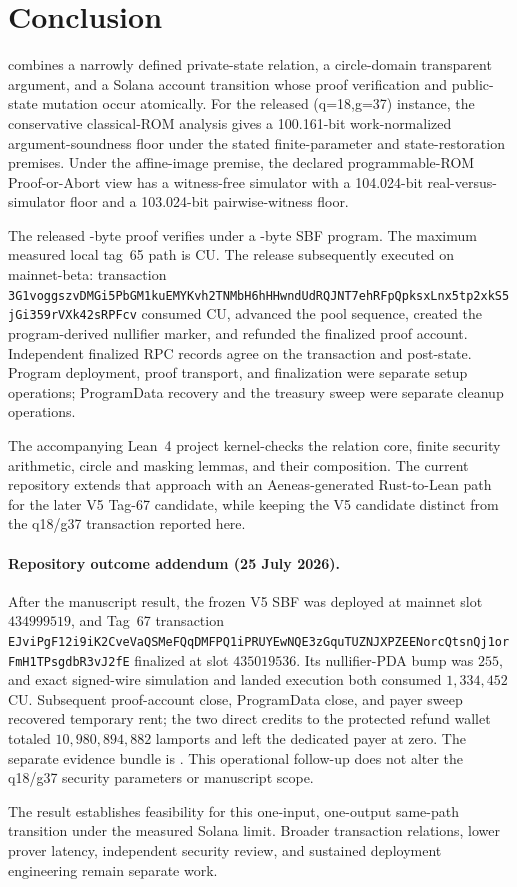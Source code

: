 \section{Conclusion}
\label{sec:conclusion}

\Profile{} combines a narrowly defined private-state relation, a
circle-domain transparent argument, and a Solana account transition whose
proof verification and public-state mutation occur atomically.  For the
released (q=18,g=37) instance, the conservative classical-ROM analysis gives
a 100.161-bit work-normalized argument-soundness floor under the stated
finite-parameter and state-restoration premises.  Under the affine-image
premise, the declared programmable-ROM Proof-or-Abort view has a witness-free
simulator with a 104.024-bit real-versus-simulator floor and a 103.024-bit
pairwise-witness floor.

The released \ProfileProofBytes-byte proof verifies under a
\ProfileSbfBytes-byte SBF program.  The maximum measured local tag~65 path is
\ProfileComputeUnits{} CU. The release subsequently executed on
mainnet-beta: transaction
\nolinkurl{3G1voggszvDMGi5PbGM1kuEMYKvh2TNMbH6hHHwndUdRQJNT7ehRFpQpksxLnx5tp2xkS5jGi359rVXk42sRPFcv}
consumed \ProfileMainnetComputeUnits{} CU, advanced the pool sequence,
created the program-derived nullifier marker, and refunded the finalized proof
account.  Independent finalized RPC records agree on the transaction and
post-state.  Program deployment, proof transport, and finalization were
separate setup operations; ProgramData recovery and the treasury sweep were
separate cleanup operations.

The accompanying Lean~4 project kernel-checks the relation core, finite
security arithmetic, circle and masking lemmas, and their composition. The
current repository extends that approach with an Aeneas-generated
Rust-to-Lean path for the later V5 Tag-67 candidate, while keeping the V5
candidate distinct from the q18/g37 transaction reported here.

\paragraph{Repository outcome addendum (25 July 2026).}
After the manuscript result, the frozen V5 SBF was deployed at mainnet slot
\(434999519\), and Tag~67 transaction
\nolinkurl{EJviPgF12i9iK2CveVaQSMeFQqDMFPQ1iPRUYEwNQE3zGquTUZNJXPZEENorcQtsnQj1orFmH1TPsgdbR3vJ2fE}
finalized at slot \(435019536\).  Its nullifier-PDA bump was \(255\),
and exact signed-wire simulation and landed execution both consumed
\(1{,}334{,}452\) CU.  Subsequent proof-account close, ProgramData close, and
payer sweep recovered temporary rent; the two direct credits to the protected
refund wallet totaled \(10{,}980{,}894{,}882\) lamports and left the dedicated
payer at zero.  The separate evidence bundle is
.  This operational follow-up does not
alter the q18/g37 security parameters or manuscript scope.

The result establishes feasibility for this one-input, one-output same-path
transition under the measured Solana limit.  Broader transaction relations,
lower prover latency, independent security review, and sustained deployment
engineering remain separate work.
